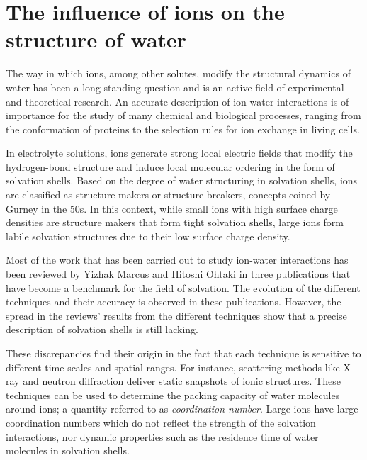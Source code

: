 \section{The influence of ions on the structure of water}



The way in which ions, among other solutes, modify the structural dynamics of water has been a long-standing question and is an active field of experimental and theoretical research. An accurate description of ion-water interactions is of importance for the study of many chemical and biological processes, ranging from the conformation of proteins to the selection rules for ion exchange in living cells.



In electrolyte solutions, ions generate strong local electric fields that modify the hydrogen-bond structure and induce local molecular ordering in the form of solvation shells. Based on the degree of water structuring in solvation shells, ions are classified as structure makers or structure breakers, concepts coined by Gurney in the 50s.\!\cite{Gurney1953} In this context, while small ions with high surface charge densities are structure makers that form tight solvation shells, large ions form labile solvation structures due to their low surface charge density. 


Most of the work that has been carried out to study ion-water interactions has been reviewed by Yizhak Marcus\!\cite{Marcus1988,Marcus2009} and Hitoshi Ohtaki\!\cite{Ohtaki1993} in three publications that have become a benchmark for the field of solvation. The evolution of the different techniques and their accuracy is observed in these publications. However, the spread in the reviews' results from the different techniques show that a precise description of solvation shells is still lacking.





These discrepancies find their origin in the fact that each technique is sensitive to different time scales and spatial ranges. For instance, scattering methods like X-ray and neutron diffraction deliver static snapshots of ionic structures. These techniques can be used to determine the packing capacity of water molecules around ions; a quantity referred to as \textit{coordination number}. Large ions have large coordination numbers which do not reflect the strength of the solvation interactions, nor dynamic properties such as the residence time of water molecules in solvation shells.


